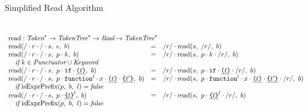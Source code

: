 \documentclass[9pt]{sigplanconf}
\begin{document}
\begin{displayfigure*}{\label{fig:simpleread}Simplified Read Algorithm}
\begin{minipage}[t]{0.5\linewidth}
\[\begin{array}{lcll}
  \end{array}
\]
\end{minipage}
\[
  \begin{array}{lcll}
    \multicolumn{3}{l}{\textrm{read} : \Tok^{*} \rightarrow \TT^{*}
      \rightarrow \textit{Bool} \rightarrow \TT^{*}}
    \\
    \readfn{/\cdot r \cdot /\cdot \vtok}{\epsilon}{b}
    &=&
    \cons{/r/}{
      \readfn{\vtok}{/r/}{b}
    }
    \\
    \readfn{/\cdot r \cdot /\cdot \vtok}{p \cdot k}{b}
    &=&
    \cons{/r/}{
      \readfn{\vtok}{
        p \cdot k \cdot /r/
      }{b}
    }
    \\
    \quad\textit{if}~k \in \textit{Punctuator} \cup \textit{Keyword}
    \\
    \readfn{/\cdot r \cdot /\cdot \vtok}{
      p \cdot \texttt{if} \cdot \parens{t}
    }{b}
    &=&
    \cons{/r/}{
      \readfn{\vtok}{p \cdot \texttt{if} \cdot \parens{t} \cdot /r/}{b}
    }
    \\
    \readfn{/\cdot r \cdot /\cdot \vtok}{
      p \cdot \texttt{function}^{l} \cdot x
      \cdot \parens{t} \cdot \curlies{t'}
    }{b}
    &=&
    \cons{/r/}{
      \readfn{\vtok}{
      p 
      \cdot \texttt{function}^{l} \cdot x \cdot 
      \parens{t} \cdot \curlies{t'}\cdot /r/
      }{b}
    } \\
    \quad \textit{if}~\isobject(p,~b,~l) = \false
    \\
    \readfn{/\cdot r \cdot / \cdot \vtok}{
      p \cdot \curlies{t}^{l}
    }{b}
    &=&
    \cons{/r/}{
      \readfn{\vtok}{
        p \cdot \curlies{t}^{l}\cdot /r/
      }{b}
    }
    \\
    \quad \textit{if}~ \isobject(p,~b,~l) = \false

    \\ \\


\end{array}\]
\end{displayfigure*}
\end{document}

